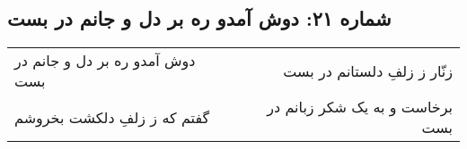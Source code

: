 \begin{center}
\section*{شماره ۲۱: دوش آمدو ره بر دل و جانم در بست}
\label{sec:021}
\begin{longtable}{l p{0.5cm} r}
دوش آمدو ره بر دل و جانم در بست
&&
زنّار ز زلفِ دلستانم در بست
\\
گفتم که ز زلفِ دلکشت بخروشم
&&
برخاست و به یک شکر زبانم در بست
\\
\end{longtable}
\end{center}
